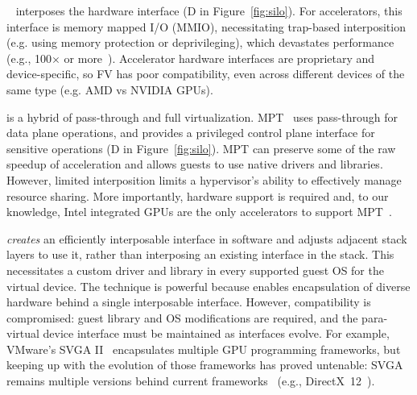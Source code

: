 ~\cite{kvmgt,suzuki2014gpuvm,gVirt} interposes the hardware interface
(D in Figure~\ref{fig:silo}). For accelerators, this interface is memory mapped I/O (MMIO),
necessitating trap-based interposition (e.g. using memory protection or deprivileging), which
devastates performance (e.g., 100$\times$ or more~\cite{suzuki2014gpuvm, yufull}).
Accelerator hardware interfaces are proprietary and device-specific, so FV has poor compatibility,
even across different devices of the same type (e.g. AMD vs NVIDIA GPUs).

 is a hybrid of pass-through and full virtualization.
MPT~\cite{gVirt,mdev-mvme,vpio}
uses pass-through for data plane operations, and provides a privileged
control plane interface for sensitive operations (D in Figure~\ref{fig:silo}).
MPT can preserve some of the raw speedup of
acceleration and allows guests to use native drivers and libraries.
However, limited interposition limits a hypervisor's ability to effectively manage resource sharing.
More importantly, hardware support is required and,
to our knowledge, Intel integrated GPUs are the only accelerators to support MPT~\cite{gVirt}.

\emph{creates} an efficiently interposable interface in software and adjusts adjacent stack
layers to use it, rather than interposing an existing interface in the stack.
This necessitates a custom driver and library in every
supported guest OS for the virtual device.
The technique is powerful because enables encapsulation of diverse hardware
behind a single interposable interface.
However, compatibility is compromised: guest library and OS modifications are required,
and the para-virtual device interface must be maintained as interfaces evolve.
For example, VMware's SVGA II~\cite{svga} encapsulates
multiple GPU programming frameworks, but keeping up with the evolution of
those frameworks has proved untenable: SVGA remains multiple versions behind current frameworks~\cite{vmware_version,svga_guest} (e.g., DirectX~12~\cite{directx_version}).

